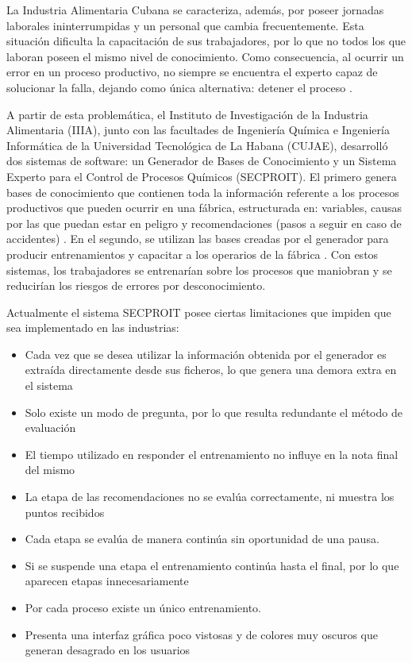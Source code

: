 La Industria Alimentaria Cubana se caracteriza, además, por poseer jornadas laborales ininterrumpidas y un personal que cambia frecuentemente. Esta situación dificulta la capacitación de sus trabajadores, por lo que no todos los que laboran poseen el mismo nivel de conocimiento. Como consecuencia, al ocurrir un error en un proceso productivo, no siempre se encuentra el experto capaz de solucionar la falla, dejando como única alternativa: detener el proceso \cite{Lemus2018}.

A partir de esta problemática, el Instituto de Investigación de la Industria Alimentaria (IIIA), junto con las facultades de Ingeniería Química e Ingeniería Informática de la Universidad Tecnológica de La Habana (CUJAE), desarrolló dos sistemas de software: un Generador de Bases de Conocimiento y  un Sistema Experto para el Control de Procesos Químicos (SECPROIT). El primero genera bases de conocimiento que contienen toda la información referente a los procesos productivos que pueden ocurrir en una fábrica, estructurada en: variables, causas por las que puedan estar en peligro y recomendaciones (pasos a seguir en caso de accidentes)  \cite{Riveron2017}. En el segundo, se utilizan las bases creadas por el generador para producir entrenamientos y capacitar a los operarios de la fábrica \cite{ElenaAcostaGil2018}. Con estos sistemas, los trabajadores se entrenarían sobre los procesos que maniobran y se reducirían los riesgos de errores por desconocimiento.

Actualmente el sistema SECPROIT posee ciertas limitaciones que impiden que sea implementado en las industrias:
\begin{itemize}
\item Cada vez que se desea utilizar la información obtenida por el generador es extraída directamente desde sus ficheros, lo que genera una demora extra en el sistema
\item Solo existe un modo de pregunta, por lo que resulta redundante el método de evaluación
\item El tiempo utilizado en responder el entrenamiento no influye en la nota final del mismo
\item La etapa de las recomendaciones no se evalúa correctamente, ni muestra los puntos recibidos
\item Cada etapa se evalúa de manera continúa sin oportunidad de una pausa.
\item Si se suspende una etapa el entrenamiento continúa hasta el final, por lo que aparecen etapas innecesariamente
\item Por cada proceso existe un único entrenamiento.
\item Presenta una interfaz gráfica poco vistosas y de colores muy oscuros que generan desagrado en los usuarios
\end{itemize}

